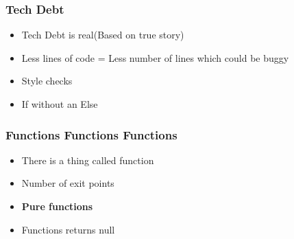 \begin{frame}[fragile]
\frametitle{Tech Debt}
\begin{itemize}
	\item Tech Debt is real(Based on true story)
	\item Less lines of code = Less number of lines which could be buggy
	\item Style checks
	\item If without an Else
\end{itemize}
\end{frame}

\begin{frame}[fragile]
\frametitle{Functions Functions Functions}
\begin{itemize}
	\item There is a thing called function
	\item Number of exit points
	\item \textbf{ Pure functions}
	\item Functions returns null
\end{itemize}
\end{frame}
